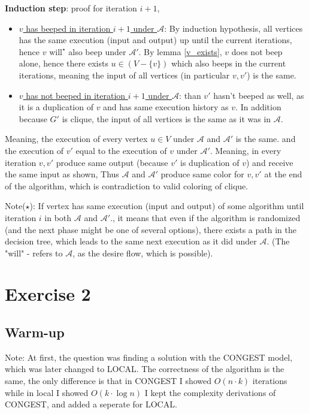 \documentclass[11pt]{article}
\begin{document}
\textbf{Induction step}: proof for iteration $i+1$,
\begin{itemize}
    \item \underline{$v$ has beeped in iteration $i+1$ under \(\mathcal{A}\)}: By induction hypothesis, all vertices has the same execution (input and output) up until the current iterations, hence $v \text{ will}^{\star}$ also beep under \(\mathcal{A'}\). By lemma \ref{v_exists}, $v$ does not beep alone, hence there exists $u\in (V - \{v\})$ which also beeps in the current iterations, meaning the input of all vertices (in particular $v,v'$) is the same. 
      \item \underline{$v$ has not beeped in iteration $i+1$ under \(\mathcal{A}\)}: than $v'$ hasn't beeped as well, as it is a duplication of $v$ and has same execution history as $v$. In addition because $G'$ is clique, the input of all vertices is the same as it was in \(\mathcal{A}\).
\end{itemize}
Meaning, the execution of every vertex $u \in V$ under \(\mathcal{A}\) and \(\mathcal{A'}\) is the same. and the execution of $v'$ equal to the execution of $v$ under \(\mathcal{A'}\).
Meaning, in every iteration $v,v'$ produce same output (because $v'$ is duplication of $v$) and receive the same input as shown, Thus \(\mathcal{A}\) and \(\mathcal{A'}\) produce same color for $v,v'$ at the end of the algorithm, which is contradiction to valid coloring of clique.

Note($\star$): If vertex has same execution (input and output) of some algorithm until iteration $i$ in both \(\mathcal{A}\) and \(\mathcal{A'}\)., it means that even if the algorithm is randomized (and the next phase might be one of several options), there exists a path in the decision tree, which leads to the same next execution as it did under \(\mathcal{A}\). (The "will" - refers to  \(\mathcal{A}\), as the desire flow, which is possible).

\newpage
\section{Exercise 2}

\subsection{Warm-up}

Note:
At first, the question was finding a solution with the CONGEST model, which was later changed to LOCAL. The correctness of the algorithm is the same, the only difference is that in CONGEST I showed $O(n \cdot k)$ iterations while in local I showed $O(k \cdot \log{n})$
I kept the complexity derivations of CONGEST, and added a seperate for LOCAL.
\end{document}
